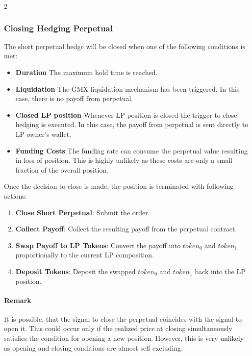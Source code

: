 \documentclass[10pt]{article}
\begin{document}
\begin{multicols}{2}
\subsubsection{Closing Hedging Perpetual}

The short perpetual hedge will be closed when one of the following conditions is met:
\begin{itemize}
	\item \textbf{Duration} The maximum hold time is reached.
	\item \textbf{Liquidation} The GMX liquidation mechanism has been triggered. In this case, there is no payoff from perpetual. 
	\item \textbf{Closed LP position} Whenever LP position is closed the trigger to close hedging is executed. In this case, the payoff from perpetual is sent directly to LP owner's wallet. 
	\item \textbf{Funding Costs} The funding rate can consume the perpetual value resulting in loss of position. This is highly unlikely as these costs are only a small fraction of the overall position.
\end{itemize}

\medskip

Once the decision to close is made, the position is terminated with following actions:
\begin{enumerate}
	\item \textbf{Close Short Perpetual}: Submit the order.
	\item \textbf{Collect Payoff}: Collect the resulting payoff from the perpetual contract.
	\item \textbf{Swap Payoff to LP Tokens}: Convert the payoff into $token_0$ and $token_1$
	proportionally to the current LP composition. 
	\item \textbf{Deposit Tokens}: Deposit the swapped $token_0$ and $token_1$
	back into the LP position.
\end{enumerate}

\paragraph{Remark}
It is possible, that the signal to close the perpetual coincides with the signal to open it. This could occur only if the realized price at closing simultaneously satisfies the condition for opening a new position. However, this is very unlikely as opening and closing conditions are almost self excluding.


\end{multicols}
\end{document}
